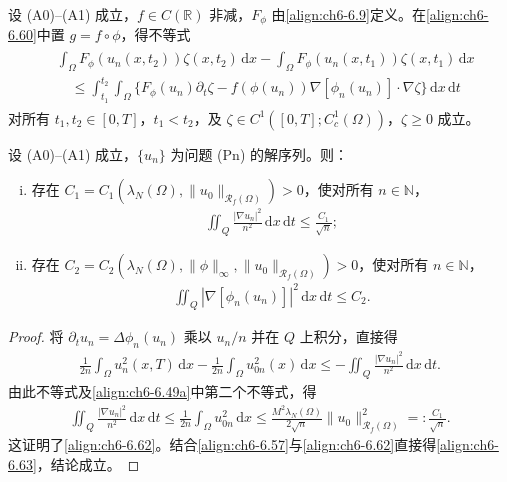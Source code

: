 \documentclass[../../main.tex]{subfiles}%
\begin{document}
\begin{remark}\label{remark:ch06-6.5.2}
设 (A0)--(A1) 成立，$f\in C(\mathbb{R})$ 非减，$F_\phi$ 由\eqref{align:ch6-6.9}定义。在\eqref{align:ch6-6.60}中置 $g=f\circ\phi$，得不等式
\begin{align}
\begin{aligned}
&\int_\Omega F_\phi(u_n(x,t_2))\zeta(x,t_2)\,\mathrm{d}x
-\int_\Omega F_\phi(u_n(x,t_1))\zeta(x,t_1)\,\mathrm{d}x\\
&\quad\leqslant\int_{t_1}^{t_2}\int_\Omega\{F_\phi(u_n)\partial_t\zeta
-f(\phi(u_n))\nabla[\phi_n(u_n)]\cdot\nabla\zeta\}\,\mathrm{d}x\,\mathrm{d}t
\end{aligned} \label{align:ch6-6.61}
\end{align}
对所有 $t_1,t_2\in[0,T]$，$t_1<t_2$，及 $\zeta\in C^1([0,T];C^1_c(\Omega))$，$\zeta\geqslant0$ 成立。
\end{remark}

\begin{lemma}\label{lemma:ch06-6.5.5}
设 (A0)--(A1) 成立，$\{u_n\}$ 为问题 (Pn) 的解序列。则：
\begin{enumerate}[(i)]
\item 存在 $C_1=C_1(\lambda_N(\Omega),\|u_0\|_{\mathscr{R}_f(\Omega)})>0$，使对所有 $n\in\mathbb{N}$，
\begin{align}
\iint_Q\frac{|\nabla u_n|^2}{n^2}\,\mathrm{d}x\,\mathrm{d}t\leqslant\frac{C_1}{\sqrt{n}}; \label{align:ch6-6.62}
\end{align}
\item 存在 $C_2=C_2(\lambda_N(\Omega),\|\phi\|_\infty,\|u_0\|_{\mathscr{R}_f(\Omega)})>0$，使对所有 $n\in\mathbb{N}$，
\begin{align}
\iint_Q|\nabla[\phi_n(u_n)]|^2\,\mathrm{d}x\,\mathrm{d}t\leqslant C_2. \label{align:ch6-6.63}
\end{align}
\end{enumerate}
\end{lemma}

\begin{proof}
将 $\partial_t u_n=\Delta\phi_n(u_n)$ 乘以 $u_n/n$ 并在 $Q$ 上积分，直接得
\begin{align*}
\frac{1}{2n}\int_\Omega u_n^2(x,T)\,\mathrm{d}x-\frac{1}{2n}\int_\Omega u_{0n}^2(x)\,\mathrm{d}x
\leqslant-\iint_Q\frac{|\nabla u_n|^2}{n^2}\,\mathrm{d}x\,\mathrm{d}t.
\end{align*}
由此不等式及\eqref{align:ch6-6.49a}中第二个不等式，得
\begin{align*}
\iint_Q\frac{|\nabla u_n|^2}{n^2}\,\mathrm{d}x\,\mathrm{d}t
\leqslant\frac{1}{2n}\int_\Omega u_{0n}^2\,\mathrm{d}x
\leqslant\frac{M^2\lambda_N(\Omega)}{2\sqrt{n}}\|u_0\|^2_{\mathscr{R}_f(\Omega)}
=:\frac{C_1}{\sqrt{n}}.
\end{align*}
这证明了\eqref{align:ch6-6.62}。结合\eqref{align:ch6-6.57}与\eqref{align:ch6-6.62}直接得\eqref{align:ch6-6.63}，结论成立。
\end{proof}
\end{document}
